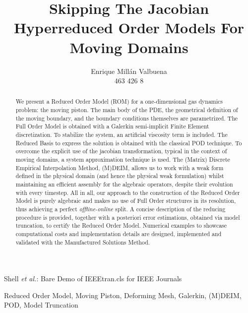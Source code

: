 \documentclass[a4paper, technote, compsoc]{IEEEtran}
\begin{document}
\onecolumn

\title{Skipping The Jacobian \\[5mm] \large{Hyperreduced Order Models For Moving Domains}}

\author{Enrique Millán Valbuena \\ \normalsize{463 426 8}}%
        
{Shell \MakeLowercase{\textit{et al.}}: Bare Demo of IEEEtran.cls for IEEE Journals}

\maketitle

\begin{abstract}
   We present a Reduced Order Model (ROM) for a one-dimensional gas dynamics problem:
   the moving piston.
   The main body of the PDE, 
   the geometrical definition of the moving boundary, 
   and the boundary conditions themselves are parametrized.
   The Full Order Model is obtained with a Galerkin semi-implicit Finite Element discretization.
   To stabilize the system, an artificial viscosity term is included.
   The Reduced Basis to express the solution is obtained with the classical POD technique.
   To overcome the explicit use of the jacobian transformation, 
   typical in the context of moving domains,
   a system approximation technique is used.
   The (Matrix) Discrete Empirical Interpolation Method, (M)DEIM, allows us
   to work with a weak form defined in the physical domain (and hence the physical weak formulation)
   whilst maintaining an
   efficient assembly for the algebraic operators, 
   despite their evolution with every timestep.
   All in all, our approach to the construction of the Reduced Order Model is purely algebraic
   and makes no use of Full Order structures in its resolution, 
   thus achieving a perfect \textit{offline-online} split.
   A concise description of the reducing procedure is provided, 
   together with a posteriori error estimations, obtained via model truncation,
   to certify the Reduced Order Model.
   Numerical examples to showcase computational costs and implementation details are designed, 
   implemented and validated with the Manufactured Solutions Method.
\end{abstract}

\begin{IEEEkeywords}
    Reduced Order Model, 
    Moving Piston, Deforming Mesh, 
    Galerkin, (M)DEIM, POD, 
    Model Truncation
\end{IEEEkeywords}
\end{document}
